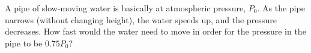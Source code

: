 A pipe of slow-moving water is basically at atmospheric pressure,
$P_0$. As the pipe narrows (without changing height), the
water speeds up, and the pressure decreases. How fast would the water
need to move in order for the pressure in the pipe to be $0.75 P_0$?\answercheck
